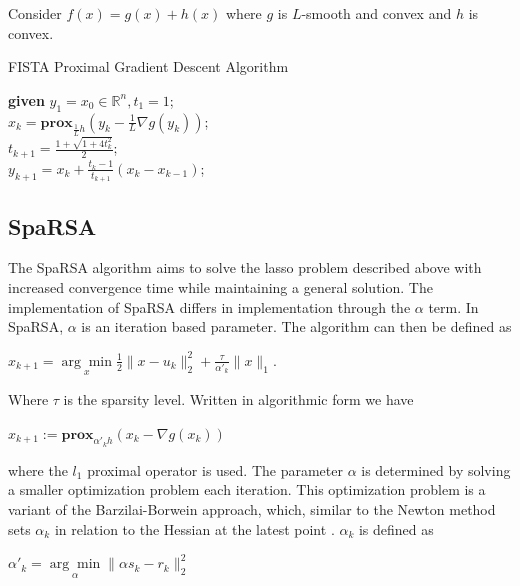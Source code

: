 \documentclass[10pt]{article} %
\begin{document}
Consider $f(x)=g(x)+h(x)$ where $g$ is $L$-smooth and convex and $h$ is convex.\\
\vspace{20pt}
\begin{algorithm}[H]
\caption{FISTA Proximal Gradient Descent Algorithm}
        
    	\textbf{given} $y_1 = x_0 \in \mathbb{R}^n, t_1 =1$;\\
     	{
      		$x_k = \mathbf{prox}_{\frac{1}{L}h}(y_k-\frac{1}{L}\nabla g(y_k))$;\\
                $t_{k+1} = \frac{1 + \sqrt{1 + 4t_k^2}}{2}$;\\
                $y_{k+1} = x_k + \frac{t_k - 1}{t_{k+1}} (x_k - x_{k-1})$;
      	}
    \end{algorithm}

\vspace{\baselineskip}

\subsection{SpaRSA}

The SpaRSA algorithm aims to solve the lasso problem described above with increased convergence time while maintaining a general solution. The implementation of SpaRSA differs in implementation through the $\alpha$ term. In SpaRSA, $\alpha$ is an iteration based parameter. The algorithm can then be defined as 

\begin{center}
    $x_{k+1} = \underset{x}{\arg\min} \frac{1}{2} \|x - u_k\|_2^2 + \frac{\tau}{\alpha'_k} \|x\|_1$. 
\end{center}

\noindent Where $\tau$ is the sparsity level. Written in algorithmic form we have 

\begin{center}
    $x_{k+1} := \mathbf{prox}_{\alpha'_k h} (x_k - \nabla g(x_k))$
\end{center}

\noindent where the $l_1$ proximal operator is used. The parameter $\alpha$ is determined by solving a smaller optimization problem each iteration. This optimization problem is a variant of the Barzilai-Borwein approach, which, similar to the Newton method sets $\alpha_k$ in relation to the Hessian at the latest point \cite{yin2015}. $\alpha_k$ is defined as 

\begin{center}
    $\alpha'_k = \underset{\alpha}{\arg\min} \| \alpha s_k - r_k \|_2^2$
\end{center}
\end{document}
